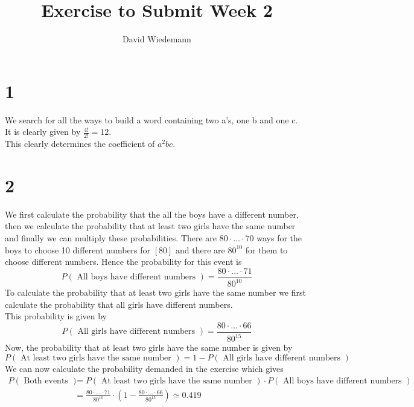 \documentclass[11pt, a4paper, twoside]{article}
\begin{document}
\title{Exercise to Submit Week 2}
\author{David Wiedemann}
\maketitle
\section*{1}

We search for all the ways to build a word containing two a's, one b and one c.\\
It is clearly given by $ \frac{4!}{2!}=12 $.\\
This clearly determines the coefficient of $a^{2}bc$.
\section*{2}
We first calculate the probability that the all the boys have a different number, then we calculate the probability that at least two girls have the same number and finally we can multiply these probabilities.
There are $80\cdot \ldots \cdot 70$ ways for the boys to choose 10 different numbers for $[80]$ and there are $80^{ 10 }$ for them to choose different numbers. Hence the probability for this event is 
\[ 
	P( \text{ All boys have different numbers }   )= \frac{80\cdot \ldots \cdot 71}{80^{10}}
\]
To calculate the probability that at least two girls have the same number we first calculate the probability that all girls have different numbers.\\
This probability is given by
\[ 
	P( \text{ All girls have different numbers } ) =\frac{80 \cdot \ldots \cdot 66}{80^{15}}
\]
Now, the probability that at least two girls have the same number is given by
\[ 
	P(  \text{ At least two girls have the same number } ) = 1- P( \text{ All girls have different numbers }) 
\]
We can now calculate the probability demanded in the exercise which gives
\begin{align*}
	P( \text{ Both events } ) &=P(  \text{ At least two girls have the same number } ) \cdot P( \text{ All boys have different numbers }   ) \\
				  &= \frac{80\cdot \ldots \cdot 71}{80^{10}} \cdot \left(1-\frac{80 \cdot \ldots \cdot 66}{80^{15}} \right) \simeq 0.419
\end{align*}







\end{document}
